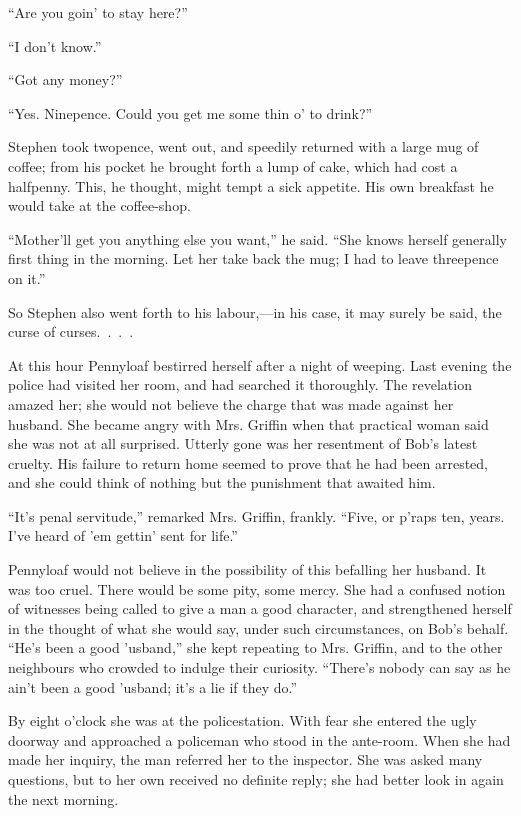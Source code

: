 ``Are you goin' to stay here?''

``I don't know.''

``Got any money?''

``Yes. Ninepence. Could you get me some thin o' to drink?''

Stephen took twopence, went out, and speedily returned with a large mug
of coffee; from his pocket he brought forth a lump of cake, which had
cost a halfpenny. This, he thought, might tempt a sick appetite. His own
breakfast he would take at the coffee-shop.

``Mother'll get you anything else you want,'' he said. ``She knows
herself generally first thing in the morning. Let her take back the mug;
I had to leave threepence on it.''

So Stephen also went forth to his labour,---in his case, it may surely
be said, the curse of curses{.~.~.~.}

At this hour Pennyloaf bestirred herself {}after a night of weeping.
Last evening the police had visited her room, and had searched it
thoroughly. The revelation amazed her; she would not believe the charge
that was made against her husband. She became angry with Mrs. Griffin
when that practical woman said she was not at all surprised. Utterly
gone was her resentment of Bob's latest cruelty. His failure to return
home seemed to prove that he had been arrested, and she could think of
nothing but the punishment that awaited him.

``It's penal servitude,'' remarked Mrs. Griffin, frankly. ``Five, or
p'raps ten, years. I've heard of 'em gettin' sent for life.''

Pennyloaf would not believe in the possibility of this befalling her
husband. It was too cruel. There would be some pity, some mercy. She had
a confused notion of witnesses being called to give a man a good
character, and strengthened herself in the thought of what she would
say, under such circumstances, on Bob's behalf. ``He's been a good
'usband,'' she kept repeating to Mrs. Griffin, and to the other
neighbours who crowded to indulge their curiosity. ``There's nobody can
say as he ain't been a good 'usband; it's a lie if they do.''

{}By eight o'clock she was at the policestation. With fear she entered
the ugly doorway and approached a policeman who stood in the ante-room.
When she had made her inquiry, the man referred her to the inspector.
She was asked many questions, but to her own received no definite reply;
she had better look in again the next morning.

